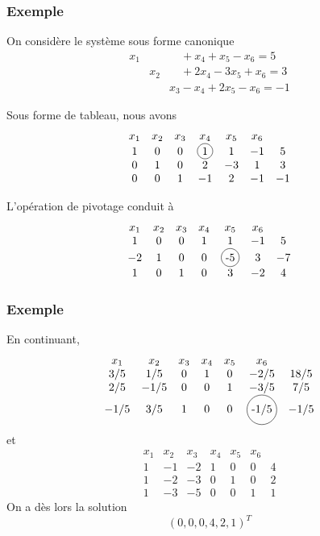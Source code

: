 \documentclass[t,usepdftitle=false]{beamer}
\newcommand*\circled[1]{\tikz[baseline=(char.base)]{
    \node[shape=circle,draw,inner sep=2pt] (char) {#1};}}
\begin{document}
\begin{frame}
\frametitle{Exemple}

On considère le système sous forme canonique
\begin{eqnarray*}
x_1 & & \quad + x_4 +  x_5 - x_6 = 5 \\
& x_2 & \quad + 2x_4 -3x_5 + x_6 = 3 \\
& & x_3 -x_4 +2x_5 - x_6 = -1
\end{eqnarray*}

Sous forme de tableau, nous avons
\[
\begin{matrix}
x_1 & x_2 & x_3 & x_4 & x_5 & x_6 & \\
1 & 0 & 0 & \circled{1} & 1 & -1 & 5 \\
0 & 1 & 0 & 2 & -3 & 1 & 3 \\
0 & 0 & 1 & -1 & 2 & -1 & -1
\end{matrix}
\]

L'opération de pivotage conduit à
\[
\begin{matrix}
x_1 & x_2 & x_3 & x_4 & x_5 & x_6 & \\
1 & 0 & 0 & 1 & 1 & -1 & 5 \\
-2 & 1 & 0 & 0 & \circled{-5} & 3 & -7 \\
 1 & 0 & 1 & 0 & 3 & -2 & 4
\end{matrix}
\]

\end{frame}

\begin{frame}
\frametitle{Exemple}

En continuant,
\[
\begin{matrix}
x_1 & x_2 & x_3 & x_4 & x_5 & x_6 & \\
3/5 & 1/5 & 0 & 1 & 0 & -2/5 & 18/5 \\
2/5 & -1/5 & 0 & 0 & 1 & -3/5 & 7/5 \\
-1/5 & 3/5 & 1 & 0 & 0 & \circled{-1/5} & -1/5
\end{matrix}
\]
et
\[
\begin{matrix}
x_1 & x_2 & x_3 & x_4 & x_5 & x_6 & \\
1 & -1 & -2 & 1 & 0 & 0 & 4 \\
1 & -2 & -3 & 0 & 1 & 0 & 2 \\
1 & -3 & -5 & 0 & 0 & 1 & 1
\end{matrix}
\]
On a dès lors la solution
\[
(0, 0, 0, 4, 2, 1)^T
\]

\end{frame}
\end{document}
